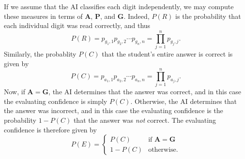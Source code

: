 \documentclass{article}
\begin{document}
If we assume
that the AI classifies each digit independently, we may compute these
measures in terms of $\mathbf{A}$, $\mathbf{P}$, and $\mathbf{G}$.
Indeed,
$P(R)$ is the probability that each individual digit was read
correctly, and thus
\begin{equation*}
    P(R)
    = p_{{g_1},1} p_{{g_2},2} \cdots p_{{g_n},n}
    = \prod_{j=1}^{n} p_{{g_j},j}.
\end{equation*}
Similarly, the probablity $P(C)$ that the student's
entire answer is correct is given by
\begin{equation*}
    P(C)
    = p_{{a_1},1} p_{{a_2},2} \cdots p_{{a_n},n}
    = \prod_{j=1}^{n} p_{{a_j},j}.
\end{equation*}
Now, if $\mathbf{A} = \mathbf{G}$, the AI determines that the
answer was correct, and in this case the evaluating confidence
is simply $P(C)$.  Otherwise, the AI determines that the answer
was incorrect, and in this case the evaluating confidence
is the probability $1 - P(C)$ that the answer was \emph{not}
correct.  The evaluating confidence is therefore given by
\begin{equation*}
    P(E) =
    \begin{cases}
        P(C) & \text{if } \mathbf{A} = \mathbf{G}
        \\
        1 - P(C) & \text{otherwise.}
    \end{cases}
\end{equation*}
\end{document}
